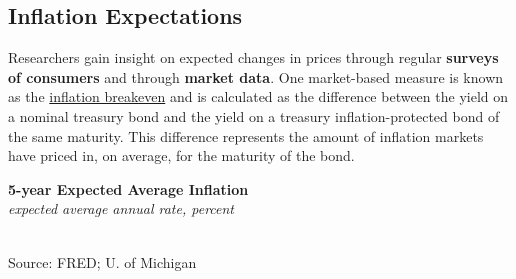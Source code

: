 \documentclass{report}
\makeatletter
\newcommand{\tbllink}[1]{\href{https://raw.githubusercontent.com/bdecon/US-chartbook/master/chartbook/data/#1}{\faTable}}
\newcommand*\short[1]{\expandafter\@gobbletwo\number\numexpr#1\relax}
\newcommand{\stdnode}[3]{\node[below, align=left, shift=({#1,#2})]{#3};}
\newcommand{\ltdateaxisticks}{
		date coordinates in=x, axis line style={draw=none},
		xmax={2022-01-30},
		max space between ticks=40,	    
		xtick={{2015-01-01}, {2016-01-01}, {2017-01-01}, {2018-01-01}, 
		    {2019-01-01}, {2020-01-01}, {2021-01-01}, {2022-01-01}},
		enlarge y limits={0.06}, enlarge x limits={0.01},
		}
\newcommand{\bbar}[2]{extra #1 ticks = {{#2}}, extra #1 tick labels = ,
		extra #1 tick style = {grid=major, grid style={thick, black!25}},}
\newcommand{\stdline}[4]{\addplot[very thick, no markers, color=#1] 
		table [x=#2, y=#3, col sep=comma] {#4};	}
\newcommand{\thinline}[4]{\addplot[no markers, color=#1] 
		table [x=#2, y=#3, col sep=comma] {#4};	}
\newcommand{\rbar}{
		\fill[color=black!10] (axis cs:{2020-02-01},\pgfkeysvalueof{/pgfplots/ymin}) rectangle 
			(axis cs:{2020-05-01}, \pgfkeysvalueof{/pgfplots/ymax});}
\makeatother
\begin{document}
{{\subsection*{\color{black!70} \seriffont Inflation Expectations}
\begin{minipage}{0.76\textwidth}
\small Researchers gain insight on expected changes in prices through regular \textbf{surveys of consumers} and through \textbf{market data}. One market-based measure is known as the \href{https://fred.stlouisfed.org/series/T5YIE}{inflation breakeven} and is calculated as the difference between the yield on a nominal treasury bond and the yield on a treasury inflation-protected bond of the same maturity. This difference represents the amount of inflation markets have priced in, on average, for the maturity of the bond.
\end{minipage}

\begin{minipage}{0.36\textwidth}
\normalsize \textbf{5-year Expected Average Inflation}\\
\footnotesize{\textit{expected average annual rate, percent}}\\
\hspace*{-2mm} \\
\footnotesize{Source: FRED; U. of Michigan} \hfill \tbllink{infbreak.csv}
\end{minipage} \hspace{6mm} 
\begin{minipage}{0.35\textwidth}
\small 


\end{minipage}
\vspace{1mm}

\begin{minipage}{0.76\textwidth}


\end{minipage}}}
\end{document}
